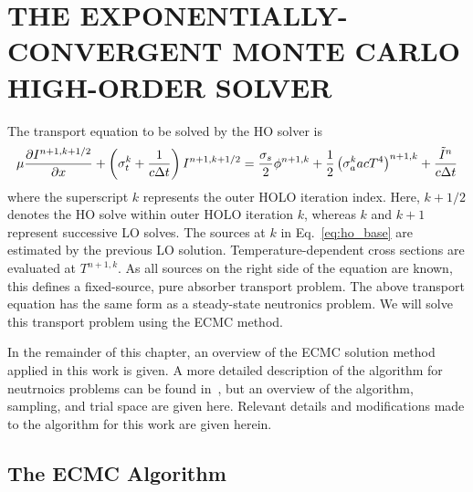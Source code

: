 
\chapter{\uppercase {The Exponentially-Convergent Monte Carlo High-Order Solver}}

The transport equation to be solved by the HO solver is
\begin{equation}\label{eq:ho_base}
\mu \frac{\partial I^{n+1,k+1/2}}{\partial x} + \left(\sigma_t^k + \frac{1}{c \Delta t }\right)
I^{n+1,k+1/2}
= \frac{\sigma_s}{2} \phi^{n+1,k} +\frac{1}{2} \left(\sigma_a^k a c T^4
\right)^{n+1,k} + \frac{\tilde I^n}{c\Delta t} 
\end{equation}
where the superscript $k$ represents the outer HOLO iteration index.  Here, $k+1/2$ denotes the
HO solve within outer HOLO iteration $k$, whereas $k$ and $k+1$ represent successive LO
solves. The sources at $k$ in Eq.~\eqref{eq:ho_base} are estimated by the previous LO
solution. Temperature-dependent cross sections are
evaluated at $T^{n+1,k}$.  As all sources on the right side of the equation are known,
this defines a fixed-source, pure absorber transport problem.  The above transport equation has
the same form as a steady-state neutronics problem.  We will solve
this transport problem using the ECMC method. 

In the remainder of this chapter, an overview of
the ECMC solution method applied in this work is given. A more detailed description of the
algorithm for neutrnoics problems can be found in~\cite{jake}, but an overview of the algorithm, sampling, and
trial space are given here.  Relevant details and modifications made to the
algorithm for this work are given herein.

\section{The ECMC Algorithm}

